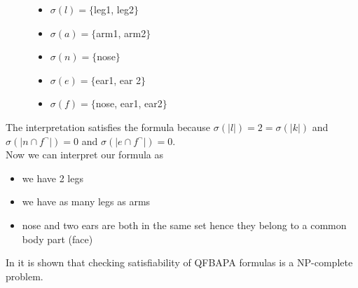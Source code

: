 \documentclass{book}
\theoremstyle{break}
\theoremstyle{definition}
\begin{document}
\begin{figure}[H]
\begin{minipage}[t]{0.5\textwidth}
\raggedright
\begin{itemize}
\item $\sigma(l)=\{$leg1, leg2$\}$
\item $\sigma(a)=\{$arm1, arm2$\}$
\end{itemize}
\end{minipage}%
\begin{minipage}[t]{0.5\textwidth}
\raggedright
\begin{itemize}
\item $\sigma(n)=\{$nose$\}$
\item $\sigma(e)=\{$ear1, ear 2$\}$
\item $\sigma(f)=\{$nose, ear1, ear2$\}$
\end{itemize}
\end{minipage}
\end{figure}
The interpretation satisfies the formula because $\sigma(|l|)=2=\sigma(|k|)$ and $\sigma(|n\cap f^\neg|)=0$ and $\sigma(|e\cap f^\neg|)=0$.\\
Now we can interpret our formula as 
\begin{itemize}
\item we have 2 legs
\item we have as many legs as arms
\item nose and two ears are both in the same set hence they belong to a common body part (face)
\end{itemize}
In \cite{KuncakRinard} it is shown that checking satisfiability of QFBAPA formulas is a NP-complete problem.
\end{document}
